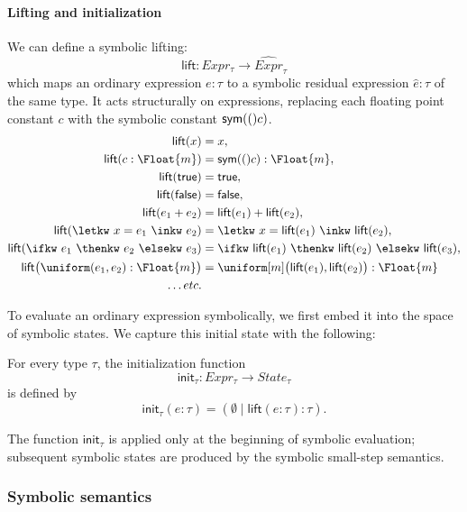 \paragraph{Lifting and initialization}
We can define a symbolic lifting:
\[
\mathsf{lift} :
Expr_\tau \longrightarrow \widehat{Expr}_\tau
\]
which maps an ordinary expression $e : \tau$ to a symbolic residual expression $\hat e : \tau$ of the same type. It acts structurally on expressions, replacing each floating point constant $c$ with the symbolic constant $\mathsf{sym}(()c)$.
\begin{align*}
\mathsf{lift}(x) &= x,\\
\mathsf{lift}(c:\Float{m}) &= \sym(c):\Float{m},\\
\mathsf{lift}(\mathsf{true}) &= \mathsf{true},\\
\mathsf{lift}(\mathsf{false}) &= \mathsf{false},\\
\mathsf{lift}(e_1+e_2)
  &= \mathsf{lift}(e_1)+\mathsf{lift}(e_2),\\
\mathsf{lift}(\letkw\ x=e_1\ \inkw\ e_2)
  &=\letkw\ x=\mathsf{lift}(e_1)\
    \inkw\ \mathsf{lift}(e_2),\\
\mathsf{lift}(\ifkw\ e_1\ \thenkw\ e_2\ \elsekw\ e_3)
  &=\ifkw\ \mathsf{lift}(e_1)\
    \thenkw\ \mathsf{lift}(e_2)\
    \elsekw\ \mathsf{lift}(e_3),\\
\mathsf{lift}\bigl(
  \uniform(e_1,e_2):\Float{m}
\bigr)
  &=
  \uniform[m]\bigl(
    \mathsf{lift}(e_1),
    \mathsf{lift}(e_2)
  \bigr):\Float{m} \\
  \ldots etc.
\end{align*}

To evaluate an ordinary expression symbolically, we first embed it into the space of symbolic states. We capture this initial state with the following:

\begin{definition}[Initialization]
  For every type $\tau$, the initialization function
  \[
    \mathsf{init}_\tau:
    Expr_\tau \to State_\tau
  \]
  is defined by
  \[
    \mathsf{init}_\tau(e:\tau)
    =
    (\emptyset\mid\mathsf{lift}(e:\tau):\tau).
  \]
\end{definition}

The function $\mathsf{init}_\tau$ is applied only at the beginning of symbolic
evaluation; subsequent symbolic states are produced by the symbolic small-step
semantics.

\subsubsection{Symbolic semantics}

